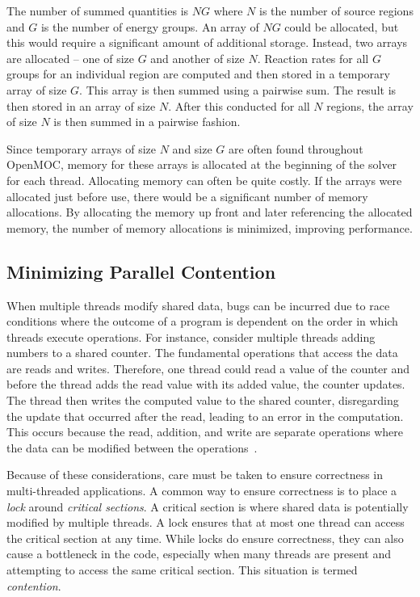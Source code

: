 The number of summed quantities is $NG$ where $N$ is the number of source regions and $G$ is the number of energy groups. An array of $NG$ could be allocated, but this would require a significant amount of additional storage. Instead, two arrays are allocated -- one of size $G$ and another of size $N$. Reaction rates for all $G$ groups for an individual region are computed and then stored in a temporary array of size $G$. This array is then summed using a pairwise sum. The result is then stored in an array of size $N$. After this conducted for all $N$ regions, the array of size $N$ is then summed in a pairwise fashion.

Since temporary arrays of size $N$ and size $G$ are often found throughout OpenMOC, memory for these arrays is allocated at the beginning of the solver for each thread. Allocating memory can often be quite costly. If the arrays were allocated just before use, there would be a significant number of memory allocations. By allocating the memory up front and later referencing the allocated memory, the number of memory allocations is minimized, improving performance.

\subsection{Minimizing Parallel Contention}

When multiple threads modify shared data, bugs can be incurred due to race conditions where the outcome of a program is dependent on the order in which threads execute operations. For instance, consider multiple threads adding numbers to a shared counter. The fundamental operations that access the data are reads and writes. Therefore, one thread could read a value of the counter and before the thread adds the read value with its added value, the counter updates. The thread then writes the computed value to the shared counter, disregarding the update that occurred after the read, leading to an error in the computation. This occurs because the read, addition, and write are separate operations where the data can be modified between the operations~\cite{shavit}.

Because of these considerations, care must be taken to ensure correctness in multi-threaded applications. A common way to ensure correctness is to place a \textit{lock} around \textit{critical sections}. A critical section is where shared data is potentially modified by multiple threads. A lock ensures that at most one thread can access the critical section at any time. While locks do ensure correctness, they can also cause a bottleneck in the code, especially when many threads are present and attempting to access the same critical section. This situation is termed \textit{contention}.

